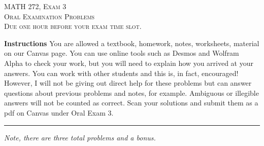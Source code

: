 \documentclass[12pt]{amsbook}
\begin{document}

\begin{center}
   \textsc{\large MATH 272, Exam 3}\\
   \textsc{Oral Examination Problems}\\
   \textsc{Due one hour before your exam time slot.}
\end{center}

\vspace{1cm}

\noindent\textbf{Instructions} \; You are allowed a textbook, homework, notes, worksheets, material on our Canvas page.  You can use online tools such as Desmos and Wolfram Alpha to check your work, but you will need to explain how you arrived at your answers.  You can work with other students and this is, in fact, encouraged! However, I will not be giving out direct help for these problems but can answer questions about previous problems and notes, for example. Ambiguous or illegible answers will not be counted as correct. Scan your solutions and submit them as a pdf on Canvas under Oral Exam 3.


\vspace{1cm}


\hrule

\vspace*{1cm}
\noindent\emph{Note, there are three total problems and a bonus.}

\end{document}
